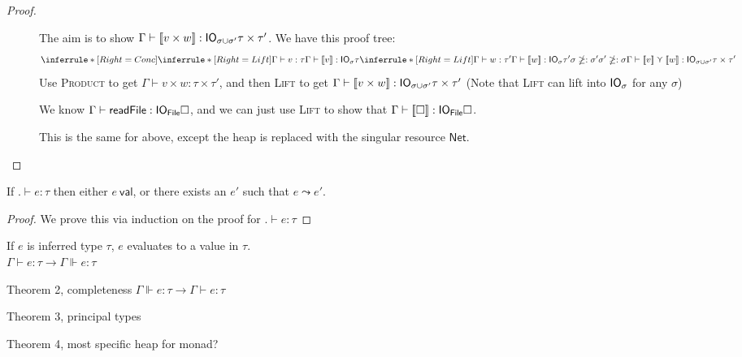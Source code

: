 \begin{proof}
\begin{description}
  \item[]
    The aim is to show $\Gamma \vdash [\![ v \times w]\!] : \mathsf{IO}_{\sigma \cup \sigma'} \tau \times \tau'$.
    We have this proof tree:
    $$\inferrule*[Right=Conc]{
      \inferrule*[Right=Lift]{\Gamma \vdash v : \tau}{\Gamma \vdash \lift{v} : \IO_\sigma \tau} \\
      \inferrule*[Right=Lift]{\Gamma \vdash w : \tau'}{\Gamma \vdash \lift{w} : \IO_\sigma \tau'}
      \\
      \sigma \notsubtyp \sigma' \\ \sigma' \notsubtyp \sigma}
    {\Gamma \vdash \lift{v} \curlyvee \lift{w} : \IO_{\sigma \cup \sigma'} \tau \times \tau'}$$
    Use \textsc{Product} to get $\Gamma \vdash v \times w : \tau \times \tau'$, and then
    \textsc{Lift} to get $\Gamma \vdash [\![ v \times w]\!] : \mathsf{IO}_{\sigma \cup \sigma'} \tau \times \tau'$
    (Note that \textsc{Lift} can lift into $\mathsf{IO}_\sigma$ for any $\sigma$)

  \item[\textmd{}]
    We know $\Gamma \vdash
    \textsf{readFile} : \mathsf{IO}_{\textsf{File}} \square$, and we can just use
    \textsc{Lift} to show that $\Gamma \vdash [\![\square]\!] : \mathsf{IO}_{\textsf{File}}
    \square$.
  \item[\textmd{}]
    This is the same for above, except the heap is replaced with the
    singular resource $\textsf{Net}$.
  \end{description}
\end{proof}

\begin{theorem}[Progress]
  If $. \vdash e : \tau$ then either $e \ \textsf{val}$, or there exists an $e'$
  such that $e \leadsto e'$.
\end{theorem}

\begin{proof}
  We prove this via induction on the proof for $. \vdash e : \tau$
\end{proof}


\begin{theorem}[Soundness]
  If $e$ is inferred type $\tau$, $e$ evaluates to a value in $\tau$. \\
  $\Gamma \vdash e : \tau \rightarrow \Gamma \Vdash e : \tau$
\end{theorem}


Theorem 2, completeness $\Gamma \Vdash e : \tau \rightarrow \Gamma \vdash e : \tau$

Theorem 3, principal types

Theorem 4, most specific heap for monad?
